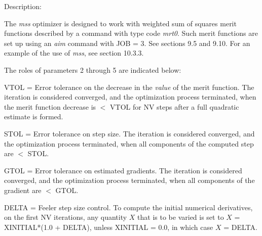 \vspace{5mm}
     Description:

The {\em mss} optimizer is designed to work with weighted sum of squares merit functions described by a command with type code {\em mrt0}.  Such merit functions are set up using an {\em aim} command with JOB = 3.  See sections 9.5 and 9.10.  For an example of the use of {\em mss}, see section 10.3.3.

The roles of parameters 2 through 5 are indicated below:

	 VTOL =  Error tolerance on the decrease in the {\em value} of the merit
	 function.  The \hspace*{6.15em}iteration is considered converged, and the optimization
	 process terminated, \hspace*{6.15em}when the merit function decrease is $<$ VTOL for NV
	 steps after a full quadratic \hspace*{6.15em}estimate is formed.

	 STOL =  Error tolerance on step size.  The iteration is considered
	 converged, and the \hspace*{6.15em}optimization
	 process terminated, when all components of the computed step \hspace*{6.15em}are
	 $<$ STOL.

	 GTOL =  Error tolerance on estimated gradients.  The iteration is
	 considered converged, \hspace*{6.15em}and the optimization
	 process terminated, when all components of the gradient \hspace*{6.15em}are $<$ GTOL.

	 DELTA = Feeler step size control.  To compute the initial numerical
	 derivatives, on the \hspace*{6.15em}first NV iterations, any quantity $X$ that is to be
	 varied is set to $X$ = \\
	 \hspace*{6.15em}XINITIAL*(1.0 + DELTA), unless XINITIAL = 0.0,
	 in which case $X$ = \hspace*{6.15em}DELTA.
\vspace{2mm}

\newpage
